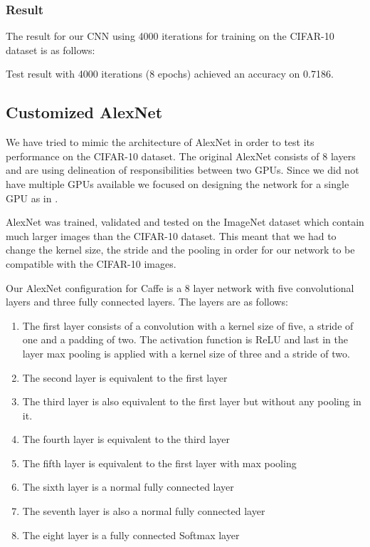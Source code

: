 \subsubsection{Result}

The result for our CNN using 4000 iterations for training on the CIFAR-10
dataset is as follows: 

Test result with 4000 iterations (8 epochs) achieved an accuracy on	0.7186.


\subsection{Customized AlexNet} %
\label{sub:alexNet}

We have tried to mimic the architecture of AlexNet\cite{AlexNet} in order
to test its performance on the CIFAR-10 dataset. The original AlexNet consists of 8
layers and are using delineation of responsibilities between two GPUs. Since we
did not have multiple GPUs available we focused on designing the network for a
single GPU as in \cite{ZeilerFergus}. 

AlexNet was trained, validated and tested on the ImageNet dataset which contain
much larger images than the CIFAR-10 dataset. This meant that we had to change
the kernel size, the stride and the pooling in order for our network to be
compatible with the CIFAR-10 images. 


Our AlexNet configuration for Caffe is a 8 layer network with five convolutional
layers and three fully connected layers. The layers are as follows:
\begin{enumerate}
	\item The first layer consists of a convolution with a kernel size of five, a
	stride of one and a padding of two. The activation function is ReLU and last in
	the layer max pooling is applied with a kernel size of three and a stride of
	two. 
	\item The second layer is equivalent to the first layer 
	\item The third layer is also equivalent to the first layer but without any
	pooling in it. 
	\item The fourth layer is equivalent to the third layer 
	\item The fifth layer is equivalent to the first layer with max pooling  
	\item The sixth layer is a normal fully connected layer
	\item The seventh layer is also a normal fully connected layer
	\item The eight layer is a fully connected Softmax layer
\end{enumerate}

